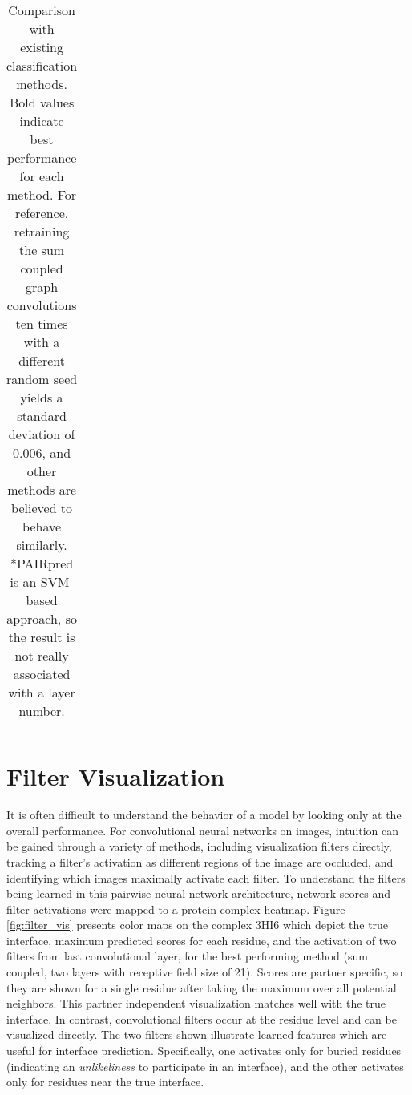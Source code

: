 \begin{table}
\begin{center}
\begin{tabular}{l c c c c c }
			\bottomrule
			
		\end{tabular}
		\caption{Comparison with existing classification methods. Bold values indicate best performance for each method. For reference, retraining the sum coupled graph convolutions ten times with a different random seed yields a standard deviation of 0.006, and other methods are believed to behave similarly. *PAIRpred is an SVM-based approach, so the result is not really associated with a layer number.}
		\label{tab:results_compare}
	\end{center}
\end{table}



\section{Filter Visualization}

It is often difficult to understand the behavior of a model by looking only at the overall performance. 
For convolutional neural networks on images, intuition can be gained through a variety of methods, including visualization filters directly, tracking a filter's activation as different regions of the image are occluded, and identifying which images maximally activate each filter. 
To understand the filters being learned in this pairwise neural network architecture, network scores and filter activations were mapped to a protein complex heatmap.
Figure \ref{fig:filter_vis} presents color maps on the complex 3HI6 which depict the true interface, maximum predicted scores for each residue, and the activation of two filters from last convolutional layer, for the best performing method (sum coupled, two layers with receptive field size of 21).
Scores are partner specific, so they are shown for a single residue after taking the maximum over all potential neighbors.
This partner independent visualization matches well with the true interface.
In contrast, convolutional filters occur at the residue level and can be visualized directly. 
The two filters shown illustrate learned features which are useful for interface prediction.
Specifically, one activates only for buried residues (indicating an \emph{unlikeliness} to participate in an interface), and the other activates only for residues near the true interface.

